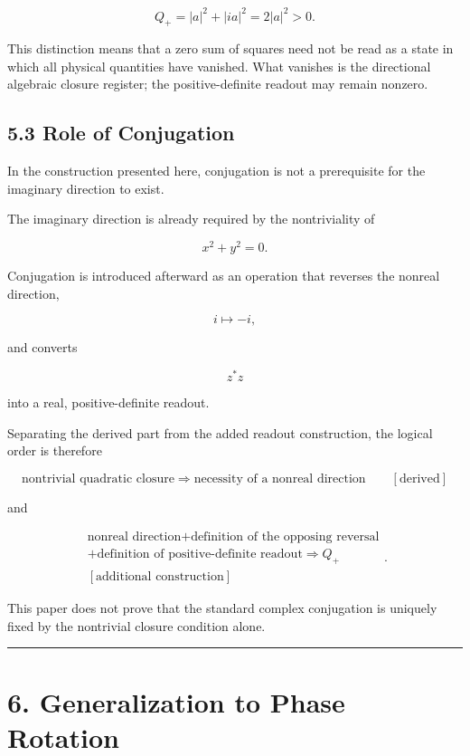 \documentclass[
  a4paper,
  10pt]{article}
\begin{document}
\[
Q_+=|a|^2+|ia|^2=2|a|^2>0.
\]

This distinction means that a zero sum of squares need not be read as a
state in which all physical quantities have vanished. What vanishes is
the directional algebraic closure register; the positive-definite
readout may remain nonzero.

\subsection{5.3 Role of Conjugation}\label{53-role-of-conjugation}

In the construction presented here, conjugation is not a prerequisite
for the imaginary direction to exist.

The imaginary direction is already required by the nontriviality of

\[
x^2+y^2=0.
\]

Conjugation is introduced afterward as an operation that reverses the
nonreal direction,

\[
i\longmapsto-i,
\]

and converts

\[
z^*z
\]

into a real, positive-definite readout.

Separating the derived part from the added readout construction, the
logical order is therefore

\[
\boxed{
\text{nontrivial quadratic closure}
\Rightarrow
\text{necessity of a nonreal direction}
\qquad[\text{derived}]
}
\]

and

\[
\boxed{
\begin{gathered}
\text{nonreal direction}+\text{definition of the opposing reversal}\\
+\text{definition of positive-definite readout}
\Rightarrow Q_+\\
[\text{additional construction}]
\end{gathered}
}.
\]

This paper does not prove that the standard complex conjugation is
uniquely fixed by the nontrivial closure condition alone.

\begin{center}\rule{0.5\linewidth}{0.5pt}\end{center}

\section{6. Generalization to Phase
Rotation}\label{6-generalization-to-phase-rotation}
\end{document}

